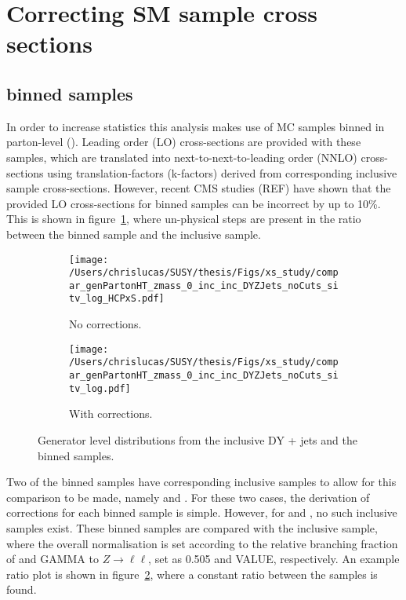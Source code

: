 \section{Correcting SM sample cross sections}
\label{sec:mc_xsec_corrs}

\subsection{\HTpart binned samples}
In order to increase statistics this analysis makes use of MC samples binned in 
parton-level \HT (\HTpart). Leading order (LO) cross-sections are provided with 
these samples, which are translated into next-to-next-to-leading order (NNLO) 
cross-sections using translation-factors (k-factors) derived from corresponding 
inclusive sample cross-sections. However, recent CMS studies (REF) have shown that the 
provided LO cross-sections for \HTpart binned samples can 
be incorrect by up to 10\%. This is shown in figure~\ref{fig:xsec_study_before},
where un-physical steps are present in the ratio between the \zj binned sample 
and the \dyj inclusive sample.

\begin{figure}[b!]
  \centering
  \begin{subfigure}[b]{0.45\textwidth}
    \texttt{[image: /Users/chrislucas/SUSY/thesis/Figs/xs\_study/compar\_genPartonHT\_zmass\_0\_inc\_inc\_DYZJets\_noCuts\_sitv\_log\_HCPxS.pdf]}
    \caption{No corrections.}
    \label{fig:xsec_study_before}
  \end{subfigure}             
  \begin{subfigure}[b]{0.45\textwidth}
    \texttt{[image: /Users/chrislucas/SUSY/thesis/Figs/xs\_study/compar\_genPartonHT\_zmass\_0\_inc\_inc\_DYZJets\_noCuts\_sitv\_log.pdf]}
    \caption{With corrections.}
    \label{fig:xsec_study_after}
  \end{subfigure}             
  \caption{Generator level \HTpart distributions from the
    inclusive DY + jets and the \HTpart binned \zj
    samples.}
  \label{fig:xsec_study}
\end{figure}

Two of the binned samples have corresponding inclusive samples to allow for 
this comparison to be made, namely \wj and \dyj. For these two cases, the 
derivation of corrections for each \HTpart binned sample is simple. However, for 
\zj and \gj, no such inclusive samples exist. These binned samples are 
compared with the inclusive \dyj sample, where the overall normalisation is 
set according to the relative branching fraction of \zinv and GAMMA to
$Z \to \ell\ell$, set as 0.505 and VALUE, respectively. An example ratio plot is
shown in figure~\ref{fig:xsec_study_after}, where a constant ratio between the 
samples is found.


